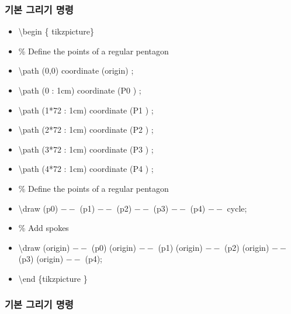 \documentclass[ aspectratio=169,  10pt,blue,xcolor=pdftex,dvipsnames,table,handout,notes]{beamer}
\begin{document}
		\begin{frame}[t]
		\frametitle{기본 그리기 명령}

			\begin{example}
			\begin{itemize}
			\item[] 	\textbackslash begin \{ tikzpicture\}
			\item[] 	\% Define the points of a regular pentagon
			\item[] 	\textbackslash path (0,0) coordinate (origin) ;
			\item[] 	\textbackslash path (0 : 1cm) coordinate (P0 ) ;
			\item[] 	\textbackslash path (1*72 : 1cm) coordinate (P1 ) ;
			\item[] 	\textbackslash path (2*72 : 1cm) coordinate (P2 ) ;
			\item[] 	\textbackslash path (3*72 : 1cm) coordinate (P3 ) ;
			\item[] 	\textbackslash path (4*72 : 1cm) coordinate (P4 ) ;
			\item[] 	\% Define the points of a regular pentagon
			\item[] 	\textbackslash draw (p0) $--$ (p1) $--$ (p2) $--$ (p3) $--$ (p4) $--$ cycle;
			\item[] 	\% Add spokes
			\item[] 	\textbackslash draw (origin) $--$ (p0) (origin) $--$ (p1) 
								(origin) $--$ (p2) (origin) $--$ (p3) (origin) $--$ (p4);
			\item[] 	\textbackslash end \{tikzpicture \}
			\end{itemize}
			\end{example}

		\note[item]{ }

		\end{frame}

		\begin{frame}[t]
		\frametitle{기본 그리기 명령}

			\begin{example}
			\end{example}

		\note[item]{ }

		\end{frame}
\end{document}
